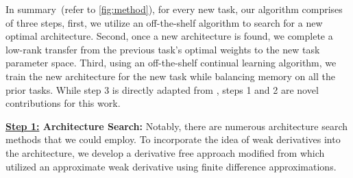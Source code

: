 In summary~(refer to \cref{fig:method}), for every new task, our algorithm comprises of three steps, first, we utilize an off-the-shelf algorithm to search for a new optimal architecture. Second, once a new architecture is found, we complete a low-rank transfer from the previous task's optimal weights to the new task parameter space. Third, using an off-the-shelf continual learning algorithm, we train the new architecture for the new task while balancing memory on all the prior tasks. While step 3 is directly adapted from \cite{chakraborty2025understanding, raghavan2021formalizing}, steps 1 and 2 are novel contributions for this work.



\textbf{\underline{Step 1:}  Architecture Search:} Notably, there are numerous architecture search methods that we could employ. To incorporate the idea of weak derivatives into the architecture, we develop a derivative free approach modified from \cite{larson2019derivative} which utilized an approximate weak derivative using finite difference approximations. 

